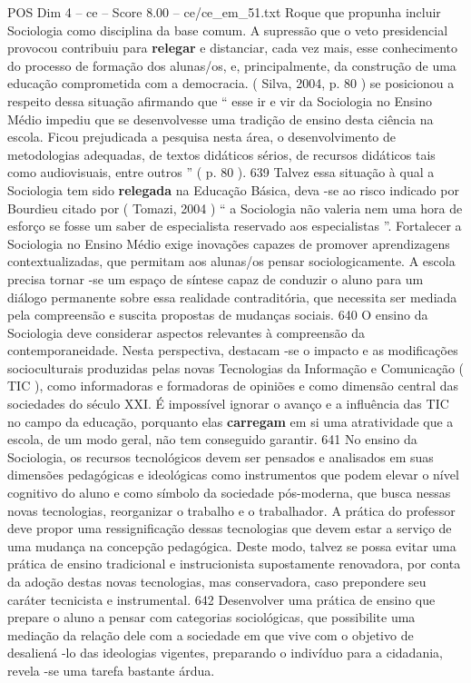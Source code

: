 \begin{textsample}{POS Dim 4 – ce – Score 8.00 – ce/ce\_em\_51.txt}
Roque que propunha incluir Sociologia como disciplina da base comum.
A supressão que o veto presidencial provocou contribuiu para \textbf{relegar} e distanciar, cada vez mais, esse conhecimento do processo de formação dos alunas/os, e, principalmente, da construção de uma educação comprometida com a democracia. ( Silva, 2004, p. 80 ) se posicionou a respeito dessa situação afirmando que “ esse ir e vir da Sociologia no Ensino Médio impediu que se desenvolvesse uma tradição de ensino desta ciência na escola.
Ficou prejudicada a pesquisa nesta área, o desenvolvimento de metodologias adequadas, de textos didáticos sérios, de recursos didáticos tais como audiovisuais, entre outros ” ( p. 80 ). 639 Talvez essa situação à qual a Sociologia tem sido \textbf{relegada} na Educação Básica, deva -se ao risco indicado por Bourdieu citado por ( Tomazi, 2004 ) “ a Sociologia não valeria nem uma hora de esforço se fosse um saber de especialista reservado aos especialistas ”.
Fortalecer a Sociologia no Ensino Médio exige inovações capazes de promover aprendizagens contextualizadas, que permitam aos alunas/os pensar sociologicamente.
A escola precisa tornar -se um espaço de síntese capaz de conduzir o aluno para um diálogo permanente sobre essa realidade contraditória, que necessita ser mediada pela compreensão e suscita propostas de mudanças sociais. 640 O ensino da Sociologia deve considerar aspectos relevantes à compreensão da contemporaneidade.
Nesta perspectiva, destacam -se o impacto e as modificações socioculturais produzidas pelas novas Tecnologias da Informação e Comunicação ( TIC ), como informadoras e formadoras de opiniões e como dimensão central das sociedades do século XXI.
É impossível ignorar o avanço e a influência das TIC no campo da educação, porquanto elas \textbf{carregam} em si uma atratividade que a escola, de um modo geral, não tem conseguido garantir. 641 No ensino da Sociologia, os recursos tecnológicos devem ser pensados e analisados em suas dimensões pedagógicas e ideológicas como instrumentos que podem elevar o nível cognitivo do aluno e como símbolo da sociedade pós-moderna, que busca nessas novas tecnologias, reorganizar o trabalho e o trabalhador.
A prática do professor deve propor uma ressignificação dessas tecnologias que devem estar a serviço de uma mudança na concepção pedagógica.
Deste modo, talvez se possa evitar uma prática de ensino tradicional e instrucionista supostamente renovadora, por conta da adoção destas novas tecnologias, mas conservadora, caso prepondere seu caráter tecnicista e instrumental. 642 Desenvolver uma prática de ensino que prepare o aluno a pensar com categorias sociológicas, que possibilite uma mediação da relação dele com a sociedade em que vive com o objetivo de desaliená -lo das ideologias vigentes, preparando o indivíduo para a cidadania, revela -se uma tarefa bastante árdua.

\end{textsample}
